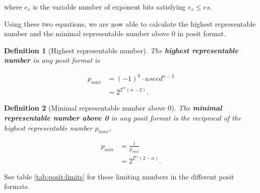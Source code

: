 \documentclass{article}
\theoremstyle{plain} %
\newtheorem{definition}{Definition}[section]
\theoremstyle{convention} %
\theoremstyle{remark} %
\def\df#1{\textbf{\textit{#1}}}
\numberwithin{equation}{section}
\begin{document}
where $e_v$ is the variable number of exponent bits satisfying $e_v \le es$.

Using these two equations, we are now able to calculate the highest representable number and the minimal representable number above \num{0} in posit format.

\begin{definition}[Highest representable number]

The \df{highest representable number} in any posit format is

\begin{align*}
    p_{max} &= (-1)^0 \cdot useed^{n-2} \\
            &= 2^{2^{es}(n-2)}.
\end{align*}

\end{definition}

\begin{definition}[Minimal representable number above \num{0}]

The \df{minimal representable number above \num{0}} in any posit format is the reciprocal of the highest representable number $p_{max}$,

\begin{align*}
    p_{min} &= \frac{1}{p_{max}} \\
            &= 2^{2^{es}(2-n)}.
\end{align*}

\end{definition}

See table \ref{tab:posit:limits} for these limiting numbers in the different posit formats.
\end{document}
